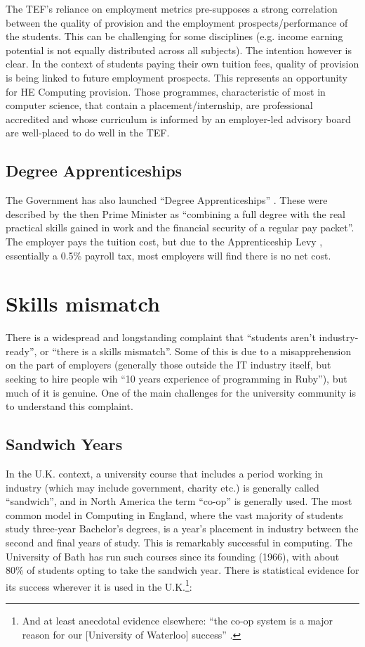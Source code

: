 \documentclass[sigconf]{acmart}
\begin{document}
The TEF's reliance on employment metrics pre-supposes a strong correlation between the quality of provision and the employment prospects/performance of the students. This can be challenging for some disciplines (e.g. income earning potential is not equally distributed across all subjects). The intention however is clear. In the context of students paying their own tuition fees, quality of provision is being linked to future employment prospects. This represents an opportunity for HE Computing provision. Those programmes, characteristic of most in computer science,  that contain a placement/internship, are professional accredited and whose curriculum is informed by an employer-led advisory board are well-placed to do well in the TEF. 

\subsection{Degree Apprenticeships}\label{sec:DA}

The Government has also launched ``Degree Apprenticeships''
\cite{BIS2015a}. These were described by the then Prime Minister as
``combining a full degree with the real practical skills gained in
work and the financial security of a regular pay packet''. The
employer pays the tuition cost, but due to the Apprenticeship Levy
\cite{HMRC2016a}, essentially a 0.5\% payroll tax, most employers will find there is no net cost.

\section{Skills mismatch}

There is a widespread and longstanding complaint that ``students
aren't industry-ready'', or ``there is a skills mismatch''. Some of
this is due to a misapprehension on the part of employers (generally
those outside the IT industry itself, but seeking to hire people wih
``10 years experience of programming in Ruby''), but much of it is
genuine. One of the main challenges for the university community is to
understand this complaint.

\subsection{Sandwich Years}

In the U.K. context, a university course that includes a period
working in industry (which may include government, charity etc.) is
generally called ``sandwich'', and in North America the term ``co-op''
is generally used. The most common model in Computing in England,
where the vast majority of students study three-year Bachelor's
degrees, is a year's placement in industry between the second and
final years of study. This is remarkably successful in computing. The
University of Bath has run such courses since its founding (1966),
with about 80\% of students opting to take the sandwich year. There is
statistical evidence for its success wherever it is used in the
U.K.\footnote{And at least anecdotal evidence elsewhere: ``the co-op
system is a major reason for our [University of Waterloo] success''
\cite{Watt2017a}.}:
\end{document}
